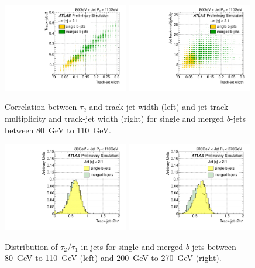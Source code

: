 \begin{figure}[tp]
\centering
\includegraphics[width=0.49\textwidth]{FIGS/VarsSingleMerged/Tau2trkWidth080.pdf}
\includegraphics[width=0.49\textwidth]{FIGS/VarsSingleMerged/NtrktrkWidth080.pdf}
\caption{Correlation between $\tau _2$ and track-jet width (left) and jet track multiplicity and track-jet width (right) for single and merged $b$-jets between 80~GeV to 110~GeV. }
\label{fig:tau2trkwidthsinglemerged}
\end{figure}

\begin{figure}[tp]
\centering
\includegraphics[width=0.49\textwidth]{FIGS/VarsSingleMerged/TauRatio080.pdf}
\includegraphics[width=0.49\textwidth]{FIGS/VarsSingleMerged/TauRatio200.pdf}
\caption{Distribution of $\tau_2/\tau_1$ in jets for single and merged $b$-jets between 80~GeV to 110~GeV (left) and 200~GeV to 270~GeV (right).}
\label{fig:tauratiosinglemerged}
\end{figure}



